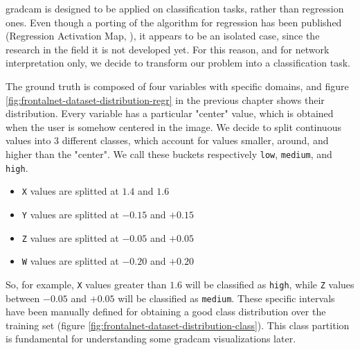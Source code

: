 \gls{gradcam} is designed to be applied on classification tasks, rather than regression ones. Even though a porting of the algorithm for regression has been published (Regression Activation Map, \cite{wang2019diabetic}), it appears to be an isolated case, since the research in the field it is not developed yet. For this reason, and for network interpretation only, we decide to transform our problem into a classification task.

The ground truth is composed of four variables with specific domains, and figure \ref{fig:frontalnet-dataset-distribution-regr} in the previous chapter shows their distribution. Every variable has a particular "center" value, which is obtained when the user is somehow centered in the image. We decide to split continuous values into 3 different classes, which account for values smaller, around, and higher than the "center". We call these buckets respectively \texttt{low}, \texttt{medium}, and \texttt{high}.

\begin{itemize}
	\item \texttt{X} values are splitted at $1.4$ and $1.6$
	\item \texttt{Y} values are splitted at $-0.15$ and $+0.15$
	\item \texttt{Z} values are splitted at $-0.05$ and $+0.05$
	\item \texttt{W} values are splitted at $-0.20$ and $+0.20$
\end{itemize}

So, for example, \texttt{X} values greater than $1.6$ will be classified as \texttt{high}, while \texttt{Z} values between $-0.05$ and $+0.05$ will be classified as \texttt{medium}. These specific intervals have been manually defined for obtaining a good class distribution over the training set (figure \ref{fig:frontalnet-dataset-distribution-class}). This class partition is fundamental for understanding some \gls{gradcam} visualizations later.

